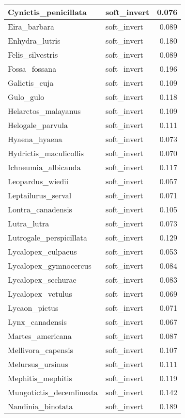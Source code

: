 \begin{table}
\begin{tabular}[t]{l|l|r}
\hline
Cynictis\_penicillata & soft\_invert & 0.076\\
\hline
Eira\_barbara & soft\_invert & 0.089\\
\hline
Enhydra\_lutris & soft\_invert & 0.180\\
\hline
Felis\_silvestris & soft\_invert & 0.089\\
\hline
Fossa\_fossana & soft\_invert & 0.196\\
\hline
Galictis\_cuja & soft\_invert & 0.109\\
\hline
Gulo\_gulo & soft\_invert & 0.118\\
\hline
Helarctos\_malayanus & soft\_invert & 0.109\\
\hline
Helogale\_parvula & soft\_invert & 0.111\\
\hline
Hyaena\_hyaena & soft\_invert & 0.073\\
\hline
Hydrictis\_maculicollis & soft\_invert & 0.070\\
\hline
Ichneumia\_albicauda & soft\_invert & 0.117\\
\hline
Leopardus\_wiedii & soft\_invert & 0.057\\
\hline
Leptailurus\_serval & soft\_invert & 0.071\\
\hline
Lontra\_canadensis & soft\_invert & 0.105\\
\hline
Lutra\_lutra & soft\_invert & 0.073\\
\hline
Lutrogale\_perspicillata & soft\_invert & 0.129\\
\hline
Lycalopex\_culpaeus & soft\_invert & 0.053\\
\hline
Lycalopex\_gymnocercus & soft\_invert & 0.084\\
\hline
Lycalopex\_sechurae & soft\_invert & 0.083\\
\hline
Lycalopex\_vetulus & soft\_invert & 0.069\\
\hline
Lycaon\_pictus & soft\_invert & 0.071\\
\hline
Lynx\_canadensis & soft\_invert & 0.067\\
\hline
Martes\_americana & soft\_invert & 0.087\\
\hline
Mellivora\_capensis & soft\_invert & 0.107\\
\hline
Melursus\_ursinus & soft\_invert & 0.111\\
\hline
Mephitis\_mephitis & soft\_invert & 0.119\\
\hline
Mungotictis\_decemlineata & soft\_invert & 0.142\\
\hline
Nandinia\_binotata & soft\_invert & 0.189\\

\end{tabular}
\end{table}
